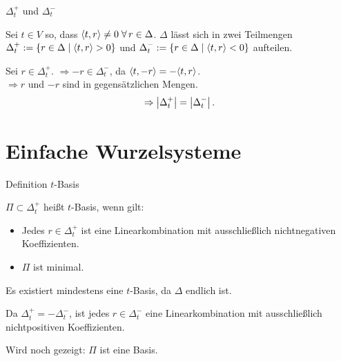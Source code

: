 \documentclass{beamer}
\begin{document}
\begin{frame}{\( \Delta_t^+ \) und \( \Delta_t^- \)}
    \begin{defi}
        Sei \( t \in V \) so, dass \( \scalarprod{t}{r} \neq 0 
        \; \forall r \in \Delta \). \pause
        \( \Delta \) lässt sich in zwei Teilmengen 
        \( \Delta_t^+ := 
        \{r \in \Delta \;\vert \; \langle t, r \rangle > 0\} \) 
        und \( \Delta_t^- := 
        \{r \in \Delta \;\vert \; \langle t, r \rangle < 0\} \) 
        aufteilen. \pause
    \end{defi}
    

    Sei \( r \in \Delta_t^+ \). \( \Rightarrow -r \in \Delta_t^- \), 
    da \( \langle t, -r \rangle = -\langle t, r \rangle \).\\
    \( \Rightarrow r \) und \( -r \) sind in 
    gegensätzlichen Mengen. \pause
    \[ \Rightarrow \left|\Delta_t^+\right| = \left|\Delta_t^-\right|. \]
\end{frame}

\section{Einfache Wurzelsysteme}
\begin{frame}{Definition \( t \)-Basis}
    \begin{defi}
        \( \Pi \subset \Delta_t^+ \) heißt \( t \)-Basis, 
        wenn gilt:
        \begin{itemize}
            \item Jedes \( r \in \Delta_t^+ \) ist 
            eine Linearkombination mit ausschließlich 
            nichtnegativen Koeffizienten.
            \item \( \Pi \) ist minimal.
        \end{itemize} \pause
        Es existiert mindestens eine \( t \)-Basis, 
        da \( \Delta \) endlich ist. \pause
    \end{defi}
    
    
    Da \( \Delta_t^+ = - \Delta_t^- \), ist jedes 
    \( r \in \Delta_t^- \) eine Linearkombination 
    mit ausschließlich nichtpositiven Koeffizienten.

    \pause
    Wird noch gezeigt: \( \Pi \) ist eine Basis.
\end{frame}
\end{document}
